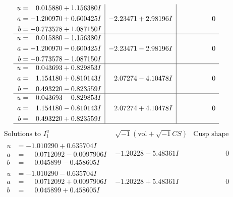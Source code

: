 \documentclass[1p]{elsarticle_modified}
\theoremstyle{definition}
\newcommand{\I}{\sqrt{-1}}
\begin{document}
$$\begin{array}{c|c|c}
\begin{aligned}
u &= \phantom{-}0.015880 + 1.156380 I \\
a &= -1.200970 + 0.600425 I \\
b &= -0.773578 + 1.087150 I\end{aligned}
 & -2.23471 + 2.98196 I & \phantom{-0.000000 } 0 \\ \hline\begin{aligned}
u &= \phantom{-}0.015880 - 1.156380 I \\
a &= -1.200970 - 0.600425 I \\
b &= -0.773578 - 1.087150 I\end{aligned}
 & -2.23471 - 2.98196 I & \phantom{-0.000000 } 0 \\ \hline\begin{aligned}
u &= \phantom{-}0.043693 + 0.829853 I \\
a &= \phantom{-}1.154180 + 0.810143 I \\
b &= \phantom{-}0.493220 - 0.823559 I\end{aligned}
 & \phantom{-}2.07274 - 4.10478 I & \phantom{-0.000000 } 0 \\ \hline\begin{aligned}
u &= \phantom{-}0.043693 - 0.829853 I \\
a &= \phantom{-}1.154180 - 0.810143 I \\
b &= \phantom{-}0.493220 + 0.823559 I\end{aligned}
 & \phantom{-}2.07274 + 4.10478 I & \phantom{-0.000000 } 0\\
 \hline 
 \end{array}$$\newpage$$\begin{array}{c|c|c}  
\text{Solutions to }I^u_{1}& \I (\text{vol} + \sqrt{-1}CS) & \text{Cusp shape}\\
 \hline 
\begin{aligned}
u &= -1.010290 + 0.635704 I \\
a &= \phantom{-}0.0712092 - 0.0097906 I \\
b &= \phantom{-}0.045899 - 0.458605 I\end{aligned}
 & -1.20228 - 5.48361 I & \phantom{-0.000000 } 0 \\ \hline\begin{aligned}
u &= -1.010290 - 0.635704 I \\
a &= \phantom{-}0.0712092 + 0.0097906 I \\
b &= \phantom{-}0.045899 + 0.458605 I\end{aligned}
 & -1.20228 + 5.48361 I & \phantom{-0.000000 } 0 \\ \hline\begin{aligned}

\end{aligned}
\end{array}$$
\end{document}
